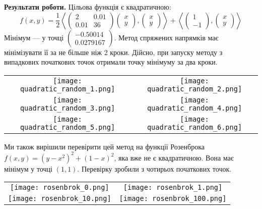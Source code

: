 \documentclass{extreport}
\begin{document}
\noindent\textbf{Результати роботи.}
Цільова функція є квадратичною: $$f(x, y) = \frac{1}{2} \left<\begin{pmatrix}
    2 & 0.01 \\ 0.01 & 36
\end{pmatrix} \begin{pmatrix}
    x \\ y
\end{pmatrix}, \begin{pmatrix}
    x \\y
\end{pmatrix} \right> + 
\left<\begin{pmatrix}
    1 \\ -1
\end{pmatrix}, \begin{pmatrix}
    x \\y
\end{pmatrix} \right>$$
Мінімум --- у точці $\begin{pmatrix}
    -0.50014 \\
    0.0279167
\end{pmatrix}$.
Метод спряжених напрямків має мінімізувати її за не більше ніж 2 кроки. Дійсно, при запуску методу з випадкових початкових точок
отримали точку мінімуму за два кроки.
\begin{center}
    \begin{tabular}{c c}
        \texttt{[image: quadratic\_random\_1.png]} &
        \texttt{[image: quadratic\_random\_2.png]} \\
        \texttt{[image: quadratic\_random\_3.png]} &
        \texttt{[image: quadratic\_random\_4.png]} \\
        \texttt{[image: quadratic\_random\_5.png]} &
        \texttt{[image: quadratic\_random\_6.png]} \\
    \end{tabular}
\end{center}

Ми також вирішили перевірити цей метод на функції Розенброка
$f(x, y) = (y-x^2)^2 + (1-x)^2$, яка вже не є квадратичною. Вона має мінімум у точці $(1, 1)$.
Перевірку зробили з чотирьох початкових точок.
\begin{center}
    \begin{tabular}{c c}
        \texttt{[image: rosenbrok\_0.png]} &
        \texttt{[image: rosenbrok\_1.png]} \\
        \texttt{[image: rosenbrok\_10.png]} &
        \texttt{[image: rosenbrok\_100.png]} \\
    \end{tabular}
\end{center}
\end{document}
